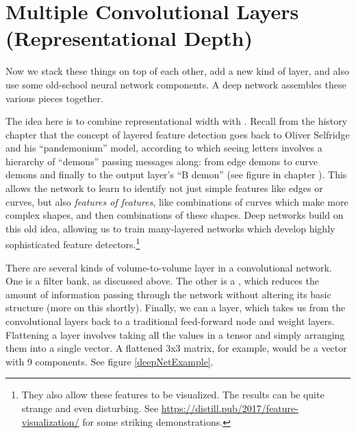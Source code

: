 \section{Multiple Convolutional Layers (Representational Depth)}

Now we stack these things on top of each other, add a new kind of layer, and also use some old-school neural network components. A deep network assembles these various pieces together.

The idea here is to combine representational width with . 
Recall from the history chapter that the concept of layered feature detection goes back to Oliver Selfridge and his ``pandemonium'' model, according to which seeing letters involves a hierarchy of ``demons'' passing messages along: from edge demons to curve demons and finally to the output layer's ``B demon'' (see figure  in chapter ). This allows the network to learn to identify not just simple features like edges or curves, but also \emph{features of features}, like combinations of curves which make more complex shapes, and then combinations of these shapes. Deep networks build on this old idea, allowing us to train many-layered networks which develop highly sophisticated feature detectors.\footnote{They also allow these features to be visualized. The results can be quite strange and even disturbing. See \url{https://distill.pub/2017/feature-visualization/} for some striking demonstrations.}  

There are several kinds of volume-to-volume layer in a convolutional network. One is a filter bank, as discussed above. The other is a , which reduces the amount of information passing through the network without altering its basic structure (more on this shortly). Finally, we can  a layer, which takes us from the convolutional layers back to a traditional feed-forward  node and weight layers. Flattening a layer involves taking all the values in a tensor and simply arranging them into a single vector. A flattened 3x3 matrix, for example, would be a vector with 9 components. See figure \ref{deepNetExample}. 


